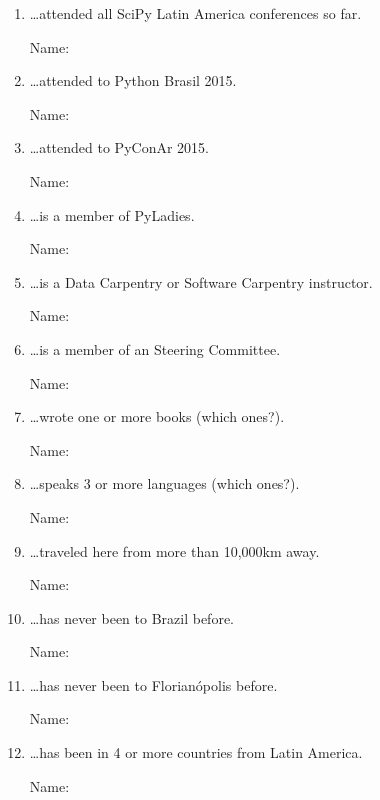 \documentclass[12pt]{article}
\begin{document}
\begin{enumerate}
  \setlength{\itemsep}{1.4em}
    \setlength{\parskip}{1.4em}

  \item \ldots attended all SciPy Latin America conferences so far.

    Name: \hrulefill

  \item \ldots attended to Python Brasil 2015.

    Name: \hrulefill

  \item \ldots attended to PyConAr 2015.

    Name: \hrulefill

  \item \ldots is a member of PyLadies.

    Name: \hrulefill

  \item \ldots is a Data Carpentry or Software Carpentry instructor.

    Name: \hrulefill

  \item \ldots is a member of an Steering Committee.

    Name: \hrulefill

  \newpage

  \item \ldots wrote one or more books (which ones?).

    Name: \hrulefill

  \item \ldots speaks 3 or more languages (which ones?).

    Name: \hrulefill

  \item \ldots traveled here from more than 10,000km away.

    Name: \hrulefill

  \item \ldots has never been to Brazil before.

    Name: \hrulefill

  \item \ldots has never been to Florianópolis before.

    Name: \hrulefill

  \item \ldots has been in 4 or more countries from Latin America.

    Name: \hrulefill

  \newpage


\end{enumerate}
\end{document}
